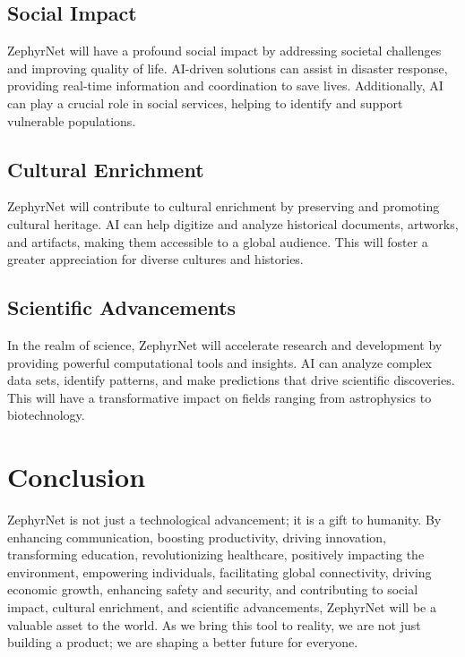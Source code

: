 \documentclass{article}
\begin{document}
	\subsection{Social Impact}
	ZephyrNet will have a profound social impact by addressing societal challenges and improving quality of life. AI-driven solutions can assist in disaster response, providing real-time information and coordination to save lives. Additionally, AI can play a crucial role in social services, helping to identify and support vulnerable populations.
	
	\subsection{Cultural Enrichment}
	ZephyrNet will contribute to cultural enrichment by preserving and promoting cultural heritage. AI can help digitize and analyze historical documents, artworks, and artifacts, making them accessible to a global audience. This will foster a greater appreciation for diverse cultures and histories.
	
	\subsection{Scientific Advancements}
	In the realm of science, ZephyrNet will accelerate research and development by providing powerful computational tools and insights. AI can analyze complex data sets, identify patterns, and make predictions that drive scientific discoveries. This will have a transformative impact on fields ranging from astrophysics to biotechnology.
	
	\section{Conclusion}
	ZephyrNet is not just a technological advancement; it is a gift to humanity. By enhancing communication, boosting productivity, driving innovation, transforming education, revolutionizing healthcare, positively impacting the environment, empowering individuals, facilitating global connectivity, driving economic growth, enhancing safety and security, and contributing to social impact, cultural enrichment, and scientific advancements, ZephyrNet will be a valuable asset to the world. As we bring this tool to reality, we are not just building a product; we are shaping a better future for everyone.
	
\end{document}
